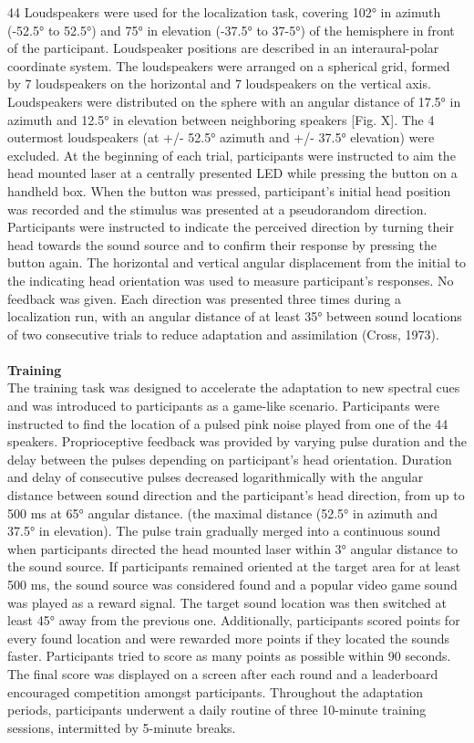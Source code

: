 44 Loudspeakers were used for the localization task, covering 102° in azimuth (-52.5° to 52.5°) and 75° in elevation (-37.5° to 37-5°) of the hemisphere in front of the participant. Loudspeaker positions are described in an interaural-polar coordinate system. The loudspeakers were arranged on a spherical grid, formed by 7 loudspeakers on the horizontal and 7 loudspeakers on the vertical axis. Loudspeakers were distributed on the sphere with an angular distance of 17.5° in azimuth and 12.5° in elevation between neighboring speakers [Fig. X]. The 4 outermost loudspeakers (at +/- 52.5° azimuth and +/- 37.5° elevation) were excluded. At the beginning of each trial, participants were instructed to aim the head mounted laser at a centrally presented LED while pressing the button on a handheld box. When the button was pressed, participant’s initial head position was recorded and the stimulus was presented at a pseudorandom direction. Participants were instructed to indicate the perceived direction by turning their head towards the sound source and to confirm their response by pressing the button again. The horizontal and vertical angular displacement from the initial to the indicating head orientation was used to measure participant’s responses. No feedback was given. Each direction was presented three times during a localization run, with an angular distance of at least 35° between sound locations of two consecutive trials to reduce adaptation and assimilation (Cross, 1973). \\\\
\textbf{Training}\\
The training task was designed to accelerate the adaptation to new spectral cues and was introduced to participants as a game-like scenario. Participants were instructed to find the location of a pulsed pink noise played from one of the 44 speakers. Proprioceptive feedback was provided by varying pulse duration and the delay between the pulses depending on participant’s head orientation. Duration and delay of consecutive pulses decreased logarithmically with the angular distance between sound direction and the participant’s head direction, from up to 500 ms at 65° angular distance. (the maximal distance (52.5° in azimuth and 37.5° in elevation). The pulse train gradually merged into a continuous sound when participants directed the head mounted laser within 3° angular distance to the sound source. If participants remained oriented at the target area for at least 500 ms, the sound source was considered found and a popular video game sound was played as a reward signal. The target sound location was then switched at least 45° away from the previous one. Additionally, participants scored points for every found location and were rewarded more points if they located the sounds faster. Participants tried to score as many points as possible within 90 seconds. The final score was displayed on a screen after each round and a leaderboard encouraged competition amongst participants. Throughout the adaptation periods, participants underwent a daily routine of three 10-minute training sessions, intermitted by 5-minute breaks. \\\\
